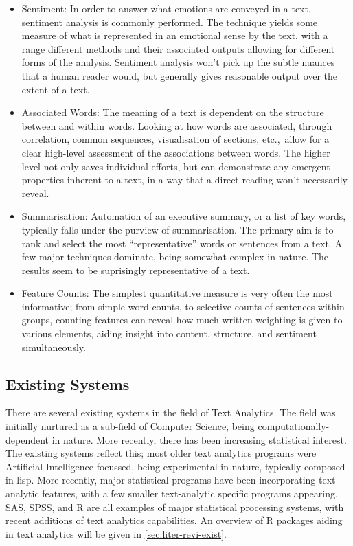 \documentclass[11pt, a4paper, oneside]{report}
\begin{document}
\begin{itemize}
\item Sentiment: In order to answer what emotions are conveyed in a
  text, sentiment analysis is commonly performed. The technique yields
  some measure of what is represented in an emotional sense by the
  text, with a range different methods and their associated outputs
  allowing for different forms of the analysis. Sentiment analysis
  won't pick up the subtle nuances that a human reader would, but
  generally gives reasonable output over the extent of a text.
\item Associated Words: The meaning of a text is dependent on the
  structure between and within words. Looking at how words are
  associated, through correlation, common sequences, visualisation of
  sections, etc.,\ allow for a clear high-level assessment of the
  associations between words. The higher level not only saves
  individual efforts, but can demonstrate any emergent properties
  inherent to a text, in a way that a direct reading won't necessarily
  reveal.
\item Summarisation: Automation of an executive summary, or a list of
  key words, typically falls under the purview of summarisation. The
  primary aim is to rank and select the most ``representative'' words
  or sentences from a text. A few major techniques dominate, being
  somewhat complex in nature. The results seem to be suprisingly
  representative of a text.
\item Feature Counts: The simplest quantitative measure is very often
  the most informative; from simple word counts, to selective counts
  of sentences within groups, counting features can reveal how much
  written weighting is given to various elements, aiding insight into
  content, structure, and sentiment simultaneously.
\end{itemize}

\subsection{Existing Systems}
There are several existing systems in the field of Text Analytics. The
field was initially nurtured as a sub-field of Computer Science, being
computationally-dependent in nature. More recently, there has been
increasing statistical interest. The existing systems reflect this;
most older text analytics programs were Artificial Intelligence
focussed, being experimental in nature, typically composed in lisp.
More recently, major statistical programs have been incorporating text
analytic features, with a few smaller text-analytic specific programs
appearing. SAS, SPSS, and R are all examples of major statistical
processing systems, with recent additions of text analytics
capabilities. An overview of R packages aiding in text analytics will
be given in \autoref{sec:liter-revi-exist}.
\end{document}
